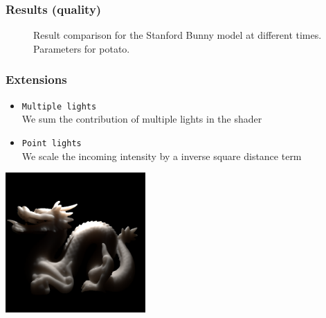 \documentclass{beamer}
\begin{document}
\begin{frame}
    \frametitle{Results (quality)}
				\begin{figure}
\centering
{}
\vspace{-0.2cm}
\caption{Result comparison for the Stanford Bunny model at different times. Parameters for potato.}
\end{figure}

\end{frame}

\begin{frame}
    \frametitle{Extensions}
\begin{itemize}
\vspace{0.4cm}
	\item \texttt{Multiple lights} \\ We sum the contribution of multiple lights in the shader
	\item \texttt{Point lights} \\ We scale the incoming intensity by a inverse square distance term	
\end{itemize}
      \centering
		\includegraphics[width=0.4\textwidth]{point}
\end{frame}
\end{document}
